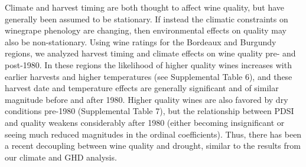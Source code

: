 \documentclass[final]{nature}
\begin{document}
\indent Climate and harvest timing are both thought to affect wine quality, but have generally been assumed to be stationary. If instead the climatic constraints on winegrape phenology are changing, then environmental effects on quality may also be non-stationary. Using wine ratings for the Bordeaux and Burgundy regions\cite{Broadbent2002}, we analyzed harvest timing and climate effects on wine quality pre- and post-1980. In these regions the likelihood of higher quality wines increases with earlier harvests and higher temperatures (see Supplemental Table 6), and these harvest date and temperature effects are generally significant and of similar magnitude before and after 1980. Higher quality wines are also favored by dry conditions pre-1980 (Supplemental Table 7), but the relationship between PDSI and quality weakens considerably after 1980 (either becoming insignificant or seeing much reduced magnitudes in the ordinal coefficients). Thus, there has been a recent decoupling between wine quality and drought, similar to the results from our climate and GHD analysis.\\
\end{document}
